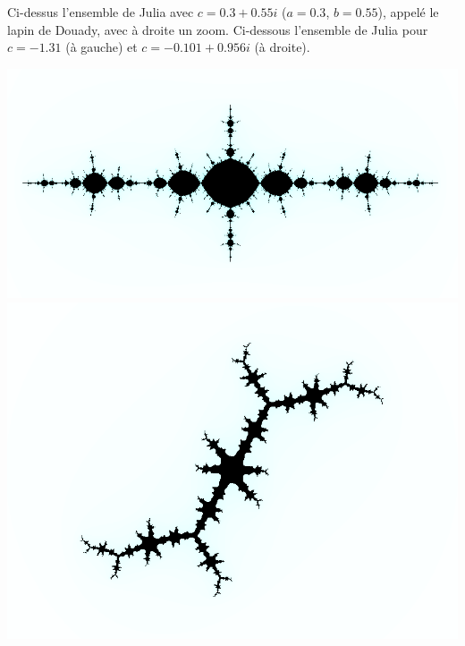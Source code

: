 \documentclass[11pt,class=report,crop=false]{standalone}
\begin{document}
Ci-dessus l'ensemble de Julia avec $c = 0.3+0.55i$ ($a=0.3$, $b=0.55$), appelé le \og{}lapin de Douady\fg{}, avec à droite un zoom.
Ci-dessous l'ensemble de Julia pour $c = -1.31$ (à gauche) et $c=-0.101 + 0.956i$ (à droite).

\begin{center}
\includegraphics[scale=\myscale,scale=0.29]{ecran-julia-3-new} \qquad
\includegraphics[scale=\myscale,scale=0.20]{ecran-julia-4-new}
\end{center}

\end{document}
